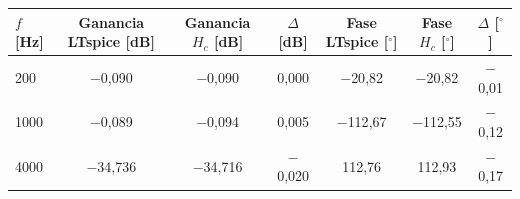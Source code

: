 \begin{tabular}{@{}lcccccc@{}}
\toprule
$f$ [Hz] & Ganancia LTspice [dB] & Ganancia $H_c$ [dB] & $\Delta$ [dB] & Fase LTspice [$^\circ$] & Fase $H_c$ [$^\circ$] & $\Delta$ [$^\circ$] \\
\midrule
200 & $-$0{,}090 & $-$0{,}090 & 0{,}000 & $-$20{,}82 & $-$20{,}82 & $-$0{,}01 \\
1000 & $-$0{,}089 & $-$0{,}094 & 0{,}005 & $-$112{,}67 & $-$112{,}55 & $-$0{,}12 \\
4000 & $-$34{,}736 & $-$34{,}716 & $-$0{,}020 & 112{,}76 & 112{,}93 & $-$0{,}17 \\
\bottomrule
\end{tabular}
